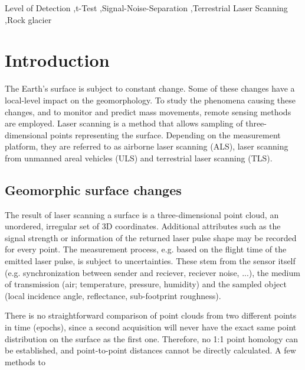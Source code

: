 \documentclass[preprint,12pt,3p]{elsarticle}
\begin{document}
\begin{frontmatter}
\begin{keyword}
Level of Detection \sep t-Test \sep Signal-Noise-Separation \sep Terrestrial Laser Scanning \sep Rock glacier


\end{keyword}

\end{frontmatter}

\linenumbers

\section{Introduction}
\label{sec:introduction}

The Earth's surface is subject to constant change. Some of these changes have a local-level impact on the geomorphology. To study the phenomena causing these changes, and to monitor and predict mass movements, remote sensing methods are employed. Laser scanning is a method that allows sampling of three-dimensional points representing the surface. Depending on the measurement platform, they are referred to as airborne laser scanning (ALS), laser scanning from unmanned areal vehicles (ULS) and terrestrial laser scanning (TLS).

\subsection{Geomorphic surface changes}

The result of laser scanning a surface is a three-dimensional point cloud, an unordered, irregular set of 3D coordinates. Additional attributes such as the signal strength or information of the returned laser pulse shape may be recorded for every point. The measurement process, e.g. based on the flight time of the emitted laser pulse, is subject to uncertainties. These stem from the sensor itself (e.g. synchronization between sender and reciever, reciever noise, ...), the medium of transmission (air; temperature, pressure, humidity) and the sampled object (local incidence angle, reflectance, sub-footprint roughness). 

There is no straightforward comparison of point clouds from two different points in time (epochs), since a second acquisition will never have the exact same point distribution on the surface as the first one. Therefore, no 1:1 point homology can be established, and point-to-point distances cannot be directly calculated. A few methods to 
\end{document}
